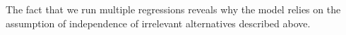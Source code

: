 \documentclass[UTF8,a4paper,10pt]{article}
\begin{document}
The fact that we run multiple regressions reveals why the model relies on the assumption of independence of irrelevant alternatives described above.





    












\pagebreak
\end{document}
